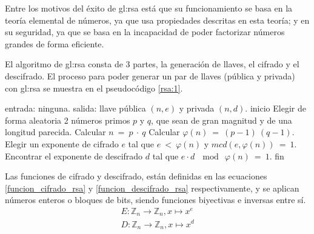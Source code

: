 Entre los motivos del éxito de \gls{gl:rsa} está que su funcionamiento
se basa en la teoría elemental de números, ya que usa propiedades descritas
en esta teoría; y en su seguridad, ya que se basa en la incapacidad de poder
factorizar números grandes de forma eficiente.

El algoritmo de \gls{gl:rsa} consta de 3 partes, la generación de llaves,
el cifrado y el descifrado. El proceso para poder generar un par de llaves
(pública y privada) con \gls{gl:rsa} se muestra en el pseudocódigo
\ref{rsa:1}.

\begin{pseudocodigo}[caption={Proceso de generación de llaves de
  \gls{gl:rsa}.}, label={rsa:1}]
    entrada: ninguna.
    salida:  llave pública $(n,e)$ y privada $(n,d)$.
    inicio
      Elegir de forma aleatoria 2 números primos $p$ y $q$, que sean de gran
      magnitud y de una longitud parecida.
      Calcular $n\: =\: p \:\cdot \:q$
      Calcular $\varphi(n) \:= \:(p-1) \:(q-1)$.
      Elegir un exponente de cifrado $e$ tal que $e \:< \:\varphi(n)$ y $mcd(e,\varphi(n)) \:= \:1$.
      Encontrar el exponente de descifrado $d$ tal que $e \cdot d \:\mod \:\varphi(n) \:= \:1$.
    fin
\end{pseudocodigo}

Las funciones de cifrado y descifrado, están definidas en las ecuaciones
\ref{funcion_cifrado_rsa} y \ref{funcion_descifrado_rsa} respectivamente,
y se aplican números enteros o bloques de bits, siendo funciones biyectivas
e inversas entre sí.
\begin{align}
  \label{funcion_cifrado_rsa}
  E: \mathbb{Z}_n \longrightarrow \mathbb{Z}_n, x \longmapsto x^e \\
  \label{funcion_descifrado_rsa}
  D: \mathbb{Z}_n \longrightarrow \mathbb{Z}_n, x \longmapsto x^d
\end{align}
